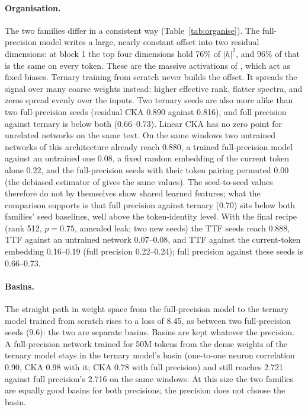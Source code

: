 \documentclass[10pt,twocolumn]{article}
\begin{document}
\paragraph{Organisation.} The two families differ in a consistent way (Table~\ref{tab:organise}). The full-precision
model writes a large, nearly constant offset into two residual dimensions: at block 1 the top four dimensions hold 76\%
of $|h|^2$, and 96\% of that is the same on every token. These are the massive activations of \citet{sun2024massive},
which act as fixed biases. Ternary training from scratch never builds the offset. It spreads the signal over many coarse
weights instead: higher effective rank, flatter spectra, and zeros spread evenly over the inputs. Two ternary seeds are
also more alike than two full-precision seeds (residual CKA 0.890 against 0.816), and full precision against ternary is
below both (0.66--0.73). Linear CKA has no zero point for unrelated networks on the same text. On the same windows two
untrained networks of this architecture already reach 0.880, a trained full-precision model against an untrained one
0.08, a fixed random embedding of the current token alone 0.22, and the full-precision seeds with their token pairing
permuted 0.00 (the debiased estimator of \citet{song2012feature} gives the same values). The seed-to-seed values
therefore do not by themselves show shared learned features; what the comparison supports is that full precision
against ternary (0.70) sits below both families' seed baselines, well above the token-identity level.
With the final recipe (rank 512, $p=0.75$, annealed leak; two new seeds) the TTF seeds reach 0.888, TTF against an
untrained network 0.07--0.08, and TTF against the current-token embedding 0.16--0.19 (full precision 0.22--0.24); full
precision against these seeds is 0.66--0.73.

\paragraph{Basins.} The straight path in weight space \citep{frankle2020linear} from the full-precision model to the ternary model trained from
scratch rises to a loss of 8.45, as between two full-precision seeds (9.6): the two are separate basins. Basins are kept
whatever the precision. A full-precision network trained for 50M tokens from the dense weights of the ternary model
stays in the ternary model's basin (one-to-one neuron correlation 0.90, CKA 0.98 with it; CKA 0.78 with full precision)
and still reaches 2.721 against full precision's 2.716 on the same windows. At this size the two families are equally
good basins for both precisions; the precision does not choose the basin.
\end{document}
